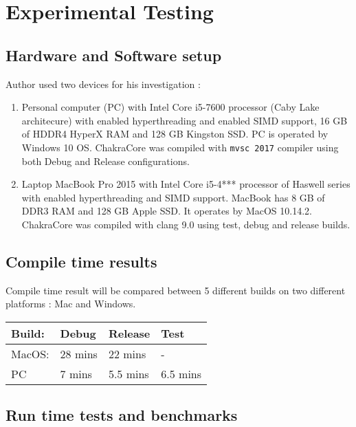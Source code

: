 \chapter{Experimental Testing}

\section{Hardware and Software setup}

Author used two devices for his investigation :
\begin{enumerate}
 \item Personal computer (PC) with Intel Core i5-7600 processor (Caby Lake architecure) with enabled hyperthreading and enabled SIMD support, 16 GB of HDDR4 HyperX RAM and 128 GB Kingston SSD.
  PC is operated by Windows 10 OS. ChakraCore was compiled with \texttt{mvsc 2017} compiler using both Debug and Release configurations.

\item Laptop MacBook Pro 2015 with Intel Core i5-4*** processor of Haswell series with enabled hyperthreading and SIMD support.
  MacBook has 8 GB of DDR3 RAM and 128 GB Apple SSD.
  It operates by MacOS 10.14.2. ChakraCore was compiled with clang 9.0 using test, debug and release builds.
\end{enumerate}

\section{Compile time results}

Compile time result will be compared between 5 different builds on two different platforms : Mac and Windows.

\begin{table}[]
\vspace{1.2cm}
\hspace{4.5cm}
\begin{tabular}{|l|l|l|l|}         \hline
Build: & Debug  & Release & Test   \\ \hline
MacOS: & 28 mins  & 22 mins & -    \\ \hline
PC & 7 mins & 5.5 mins  & 6.5 mins \\ \hline
\end{tabular}
\end{table}

\vspace{3cm}

\section{Run time tests and benchmarks}

